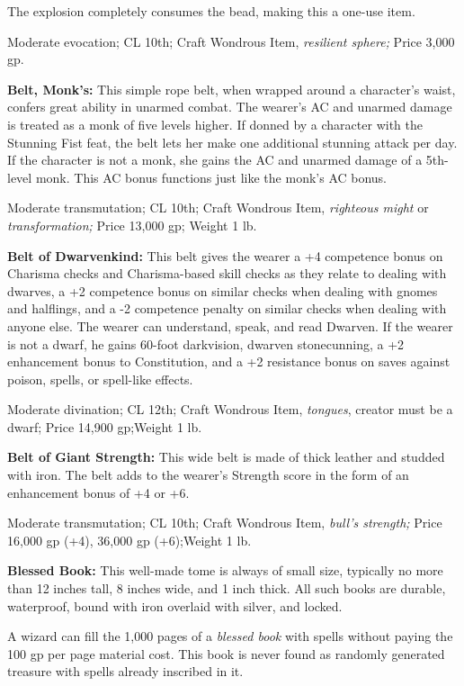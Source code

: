 The explosion completely consumes the bead, making this a one-use item.

Moderate evocation; CL 10th; Craft Wondrous Item, \textit{resilient sphere; }Price 
3,000 gp.

\textbf{Belt, Monk's:} This simple rope belt, when wrapped around a character's 
waist, confers great ability in unarmed combat. The wearer's AC and unarmed damage 
is treated as a monk of five levels higher. If donned by a character with the Stunning 
Fist feat, the belt lets her make one additional stunning attack per day. If the 
character is not a monk, she gains the AC and unarmed damage of a 5th-level monk. 
This AC bonus functions just like the monk's AC bonus.

Moderate transmutation; CL 10th; Craft Wondrous Item, \textit{righteous might }or 
\textit{transformation; }Price 13,000 gp; Weight 1 lb.

\textbf{Belt of Dwarvenkind: }This belt gives the wearer a +4 competence bonus 
on Charisma checks and Charisma-based skill checks as they relate to dealing with 
dwarves, a +2 competence bonus on similar checks when dealing with gnomes and halflings, 
and a -2 competence penalty on similar checks when dealing with anyone else. The 
wearer can understand, speak, and read Dwarven. If the wearer is not a dwarf, he 
gains 60-foot darkvision, dwarven stonecunning, a +2 enhancement bonus to Constitution, 
and a +2 resistance bonus on saves against poison, spells, or spell-like effects.

Moderate divination; CL 12th; Craft Wondrous Item, \textit{tongues}, creator must 
be a dwarf; Price 14,900 gp;Weight 1 lb.

\textbf{Belt of Giant Strength:} This wide belt is made of thick leather and studded 
with iron. The belt adds to the wearer's Strength score in the form of an enhancement 
bonus of +4 or +6.

Moderate transmutation; CL 10th; Craft Wondrous Item, \textit{bull's strength; 
}Price 16,000 gp (+4), 36,000 gp (+6);Weight 1 lb.

\textbf{Blessed Book:} This well-made tome is always of small size, typically no 
more than 12 inches tall, 8 inches wide, and 1 inch thick. All such books are durable, 
waterproof, bound with iron overlaid with silver, and locked.

A wizard can fill the 1,000 pages of a \textit{blessed book }with spells without 
paying the 100 gp per page material cost. This book is never found as randomly 
generated treasure with spells already inscribed in it.

